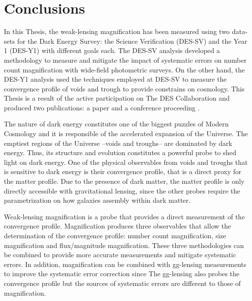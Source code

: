 \chapter{Conclusions}
\label{ch:conclusions}
In this Thesis, the weak-lensing magnification has been measured using two data-sets for the Dark Energy Survey: the Science Verification (DES-SV) and the Year 1 (DES-Y1) with different goals each. The DES-SV analysis developed a methodology to measure and mitigate the impact of systematic errors on number count magnification with wide-field photometric surveys. On the other hand, the DES-Y1 analysis used the techniques employed at DES-SV to measure the convergence profile of voids and trough to provide constrains on cosmology. This Thesis is a result of the active participation on The DES Collaboration and produced two publications: a paper \cite{2016arXiv161110326G} and a conference proceeding \cite{2017hsa9.conf..163G}.
\newline

The nature of dark energy constitutes one of the biggest puzzles of Modern Cosmology and it is responsible of the accelerated expansion of the Universe. The emptiest regions of the Universe --voids and troughs-- are dominated by dark energy. Thus, its structure and evolution constitutes a powerful probe to shed light on dark energy. One of the physical observables from voids and troughs that is sensitive to dark energy is their convergence profile, that is a direct proxy for the matter profile. Due to the presence of dark matter, the matter profile is only directly accessible with gravitational lensing, since the other probes require the parametrization on how galaxies assembly within dark matter.
\newline

Weak-lensing magnification is a probe that provides a direct measurement of the convergence profile. Magnification produces three observables that allow the determination of the convergence profile: number count magnification, size magnification and flux/magnitude magnification. These three methodologies can be combined to provide more accurate measurements and mitigate systematic errors. In addition, magnification can be combined with gg-lensing measurements to improve the systematic error correction since The gg-lensing also probes the convergence profile but the sources of systematic errors are different to those of magnification.
\newline

